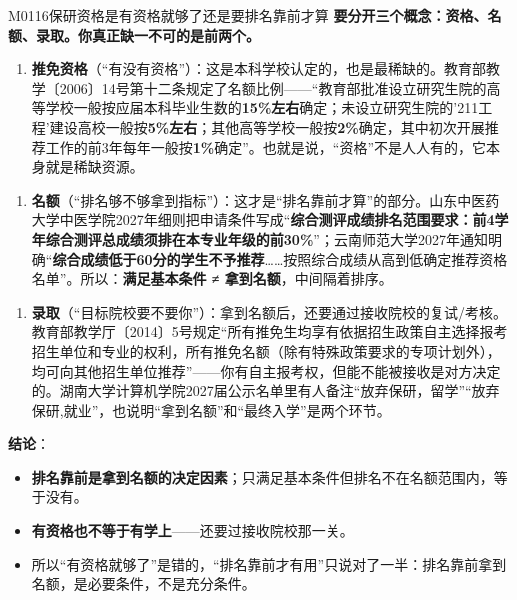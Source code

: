 \begin{qa}{M0116}{保研资格是有资格就够了还是要排名靠前才算}
\textbf{要分开三个概念：资格、名额、录取。你真正缺一不可的是前两个。}

\begin{enumerate}
  \item \textbf{推免资格}（“有没有资格”）：这是本科学校认定的，也是最稀缺的。教育部教学〔2006〕14号第十二条规定了名额比例——“教育部批准设立研究生院的高等学校一般按应届本科毕业生数的\textbf{15\%左右}确定；未设立研究生院的'211工程'建设高校一般按\textbf{5\%左右}；其他高等学校一般按\textbf{2\%}确定，其中初次开展推荐工作的前3年每年一般按\textbf{1\%}确定”。也就是说，“资格”不是人人有的，它本身就是稀缺资源。
\end{enumerate}

\begin{enumerate}
  \item \textbf{名额}（“排名够不够拿到指标”）：这才是“排名靠前才算”的部分。山东中医药大学中医学院2027年细则把申请条件写成“\textbf{综合测评成绩排名范围要求：前4学年综合测评总成绩须排在本专业年级的前30\%}”；云南师范大学2027年通知明确“\textbf{综合成绩低于60分的学生不予推荐}……按照综合成绩从高到低确定推荐资格名单”。所以：\textbf{满足基本条件 ≠ 拿到名额}，中间隔着排序。
\end{enumerate}

\begin{enumerate}
  \item \textbf{录取}（“目标院校要不要你”）：拿到名额后，还要通过接收院校的复试/考核。教育部教学厅〔2014〕5号规定“所有推免生均享有依据招生政策自主选择报考招生单位和专业的权利，所有推免名额（除有特殊政策要求的专项计划外），均可向其他招生单位推荐”——你有自主报考权，但能不能被接收是对方决定的。湖南大学计算机学院2027届公示名单里有人备注“放弃保研，留学”“放弃保研,就业”，也说明“拿到名额”和“最终入学”是两个环节。
\end{enumerate}

\textbf{结论}：
\begin{itemize}
  \item \textbf{排名靠前是拿到名额的决定因素}；只满足基本条件但排名不在名额范围内，等于没有。
  \item \textbf{有资格也不等于有学上}——还要过接收院校那一关。
  \item 所以“有资格就够了”是错的，“排名靠前才有用”只说对了一半：排名靠前拿到名额，是必要条件，不是充分条件。
\end{itemize}
\end{qa}

